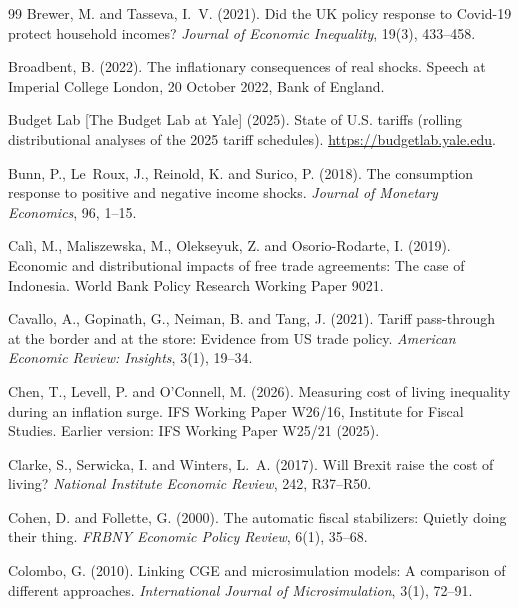 \begin{thebibliography}{99}
Brewer, M. and Tasseva, I.~V. (2021).
\newblock Did the UK policy response to Covid-19 protect household incomes?
\newblock \emph{Journal of Economic Inequality}, 19(3), 433--458.

Broadbent, B. (2022).
\newblock The inflationary consequences of real shocks.
\newblock Speech at Imperial College London, 20 October 2022, Bank of England.

Budget Lab [The Budget Lab at Yale] (2025).
\newblock State of U.S. tariffs (rolling distributional analyses of the 2025 tariff schedules).
\newblock \url{https://budgetlab.yale.edu}.

Bunn, P., Le~Roux, J., Reinold, K. and Surico, P. (2018).
\newblock The consumption response to positive and negative income shocks.
\newblock \emph{Journal of Monetary Economics}, 96, 1--15.

Cal\`i, M., Maliszewska, M., Olekseyuk, Z. and Osorio-Rodarte, I. (2019).
\newblock Economic and distributional impacts of free trade agreements: The case of Indonesia.
\newblock World Bank Policy Research Working Paper 9021.

Cavallo, A., Gopinath, G., Neiman, B. and Tang, J. (2021).
\newblock Tariff pass-through at the border and at the store: Evidence from US trade policy.
\newblock \emph{American Economic Review: Insights}, 3(1), 19--34.

Chen, T., Levell, P. and O'Connell, M. (2026).
\newblock Measuring cost of living inequality during an inflation surge.
\newblock IFS Working Paper W26/16, Institute for Fiscal Studies. Earlier version: IFS Working Paper W25/21 (2025).

Clarke, S., Serwicka, I. and Winters, L.~A. (2017).
\newblock Will Brexit raise the cost of living?
\newblock \emph{National Institute Economic Review}, 242, R37--R50.

Cohen, D. and Follette, G. (2000).
\newblock The automatic fiscal stabilizers: Quietly doing their thing.
\newblock \emph{FRBNY Economic Policy Review}, 6(1), 35--68.

Colombo, G. (2010).
\newblock Linking CGE and microsimulation models: A comparison of different approaches.
\newblock \emph{International Journal of Microsimulation}, 3(1), 72--91.


\end{thebibliography}

